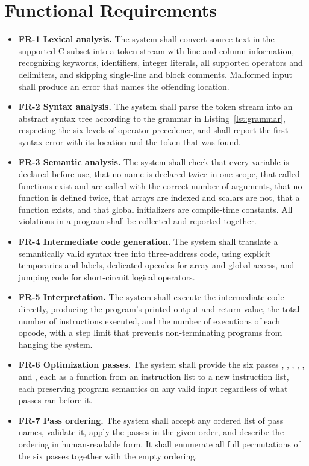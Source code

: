 \section{Functional Requirements}

\begin{itemize}
  \item \textbf{FR-1 Lexical analysis.} The system shall convert source text in the supported C subset into a token stream with line and column information, recognizing keywords, identifiers, integer literals, all supported operators and delimiters, and skipping single-line and block comments. Malformed input shall produce an error that names the offending location.
  \item \textbf{FR-2 Syntax analysis.} The system shall parse the token stream into an abstract syntax tree according to the grammar in Listing~\ref{lst:grammar}, respecting the six levels of operator precedence, and shall report the first syntax error with its location and the token that was found.
  \item \textbf{FR-3 Semantic analysis.} The system shall check that every variable is declared before use, that no name is declared twice in one scope, that called functions exist and are called with the correct number of arguments, that no function is defined twice, that arrays are indexed and scalars are not, that a  function exists, and that global initializers are compile-time constants. All violations in a program shall be collected and reported together.
  \item \textbf{FR-4 Intermediate code generation.} The system shall translate a semantically valid syntax tree into three-address code, using explicit temporaries and labels, dedicated opcodes for array and global access, and jumping code for short-circuit logical operators.
  \item \textbf{FR-5 Interpretation.} The system shall execute the intermediate code directly, producing the program's printed output and return value, the total number of instructions executed, and the number of executions of each opcode, with a step limit that prevents non-terminating programs from hanging the system.
  \item \textbf{FR-6 Optimization passes.} The system shall provide the six passes , , , , , and , each as a function from an instruction list to a new instruction list, each preserving program semantics on any valid input regardless of what passes ran before it.
  \item \textbf{FR-7 Pass ordering.} The system shall accept any ordered list of pass names, validate it, apply the passes in the given order, and describe the ordering in human-readable form. It shall enumerate all full permutations of the six passes together with the empty ordering.

\end{itemize}
